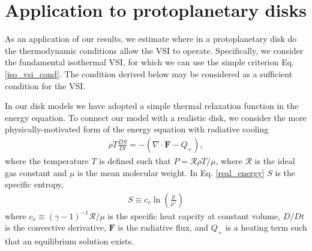 \section{Application to protoplanetary disks}
As an application of our results, we estimate where in a
protoplanetary disk do the thermodynamic conditions allow the VSI to 
operate. Specifically, we consider the fundamental isothermal VSI, 
for which we can use the simple criterion Eq. \ref{iso_vsi_cond}. The
condition derived below may be considered as a sufficient condition for the VSI.  

In our disk models we have adopted a simple thermal relaxation
function in the energy equation. To connect our model with a realistic
disk, we consider the more physically-motivated form of the energy
equation with radiative cooling 
\begin{align}\label{real_energy}
\rho T \frac{DS}{Dt} = - \left(\nabla\cdot\bm{F} - Q_+\right), 
\end{align}
where the temperature $T$ is defined such that $P=\mathcal{R}\rho
T/\mu$, where $\mathcal{R}$ is the ideal gas constant and $\mu$ is
the mean molecular weight. In Eq. \ref{real_energy} $S$ is the
specific entropy,
\begin{align}
  S \equiv c_v\ln{\left(\frac{p}{\rho^{\gamma}}\right)} 
\end{align}
where $c_v \equiv \left(\gamma-1\right)^{-1}\mathcal{R}/\mu$ is the specific heat capcity at
constant volume, $D/Dt$ is the convective derivative, $\bm{F}$ is the
radiative flux, and $Q_+$ is a heating term such that an equilibrium
solution exists.  

